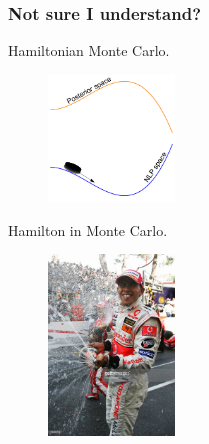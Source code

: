 \documentclass[handout]{beamer}
\begin{document}
\begin{frame}
	\frametitle{Not sure I understand?}
	Hamiltonian Monte Carlo.
	
	\begin{figure}[ht]
		\centerline{\includegraphics[width=0.3\textwidth]{./Figures/lec5_icePuck.pdf}}
	\end{figure}
	
	Hamilton in Monte Carlo.
	
	\begin{figure}[ht]
		\centerline{\includegraphics[width=0.3\textwidth]{./Figures/hamiltonMonteCarlo1.jpg}}
	\end{figure}
	
	
\end{frame}
\end{document}
